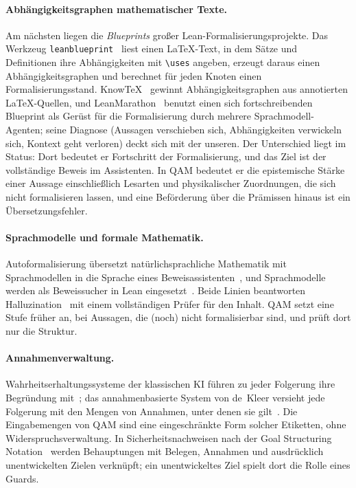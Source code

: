 \paragraph{Abhängigkeitsgraphen mathematischer Texte.} Am nächsten liegen die \emph{Blueprints} großer Lean-Formalisierungsprojekte.
Das Werkzeug \texttt{leanblueprint}~\cite{blueprint} liest einen \LaTeX-Text, in dem Sätze und Definitionen ihre Abhängigkeiten mit
\verb|\uses| angeben, erzeugt daraus einen Abhängigkeitsgraphen und berechnet für jeden Knoten einen Formalisierungsstand. KnowTeX~\cite{knowtex}
gewinnt Abhängigkeitsgraphen aus annotierten \LaTeX-Quellen, und LeanMarathon~\cite{leanmarathon} benutzt einen sich fortschreibenden
Blueprint als Gerüst für die Formalisierung durch mehrere Sprachmodell-Agenten; seine Diagnose (Aussagen verschieben sich,
Abhängigkeiten verwickeln sich, Kontext geht verloren) deckt sich mit der unseren. Der Unterschied liegt im Status: Dort bedeutet er
Fortschritt der Formalisierung, und das Ziel ist der vollständige Beweis im Assistenten. In QAM bedeutet er die epistemische Stärke einer
Aussage einschließlich Lesarten und physikalischer Zuordnungen, die sich nicht formalisieren lassen, und eine Beförderung über die
Prämissen hinaus ist ein Übersetzungsfehler.

\paragraph{Sprachmodelle und formale Mathematik.} Autoformalisierung übersetzt natürlichsprachliche Mathematik mit Sprachmodellen in die
Sprache eines Beweisassistenten~\cite{autoformal}, und Sprachmodelle werden als Beweissucher in Lean eingesetzt~\cite{leandojo}. Beide
Linien beantworten Halluzination~\cite{halluc} mit einem vollständigen Prüfer für den Inhalt. QAM setzt eine Stufe früher an, bei
Aussagen, die (noch) nicht formalisierbar sind, und prüft dort nur die Struktur.

\paragraph{Annahmenverwaltung.} Wahrheitserhaltungssysteme der klassischen KI führen zu jeder Folgerung ihre Begründung mit~\cite{doyle};
das annahmenbasierte System von de~Kleer versieht jede Folgerung mit den Mengen von Annahmen, unter denen sie gilt~\cite{atms}. Die
Eingabemengen von QAM sind eine eingeschränkte Form solcher Etiketten, ohne Widerspruchsverwaltung. In Sicherheitsnachweisen nach der
Goal Structuring Notation~\cite{gsn} werden Behauptungen mit Belegen, Annahmen und ausdrücklich unentwickelten Zielen verknüpft; ein
unentwickeltes Ziel spielt dort die Rolle eines Guards.

